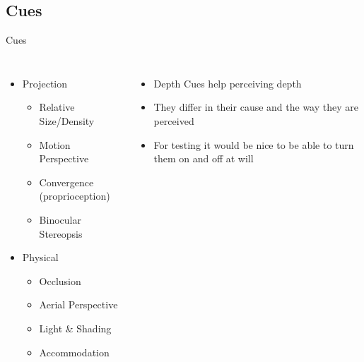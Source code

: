 \documentclass[12pt,ucs,hyperref={pdftext}]{beamer}
\begin{document}
\subsection{Cues}

\begin{frame}{Cues}
\begin{columns}

\column{5.5cm}
\begin{itemize}
\item<uncover@0> Projection
\begin{itemize}
\item Relative Size/Density
\item Motion Perspective
\item Convergence (proprioception)
\item Binocular Stereopsis
\end{itemize}

\item<uncover@0> Physical
\begin{itemize}
\item Occlusion
\item Aerial Perspective
\item Light \& Shading
\item Accommodation
\end{itemize}

\end{itemize}

\column{5.5cm}
\begin{itemize}%
\item Depth Cues help perceiving depth
\item They differ in their cause and the way they are perceived
\item For testing it would be nice to be able to turn them on and off at will
\end{itemize}

\end{columns}
\end{frame}
\end{document}
